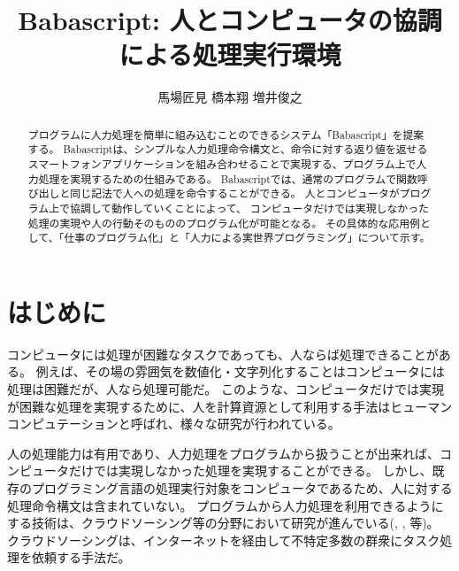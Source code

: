 \documentclass[twoside]{wiss}
\begin{document}
\title{Babascript: 人とコンピュータの協調による処理実行環境}
\etitle{} %

\author{{馬場匠見} \hspace{1em}
        {橋本翔} \hspace{1em}
        {増井俊之
        }
        }

\begin{abstract}

プログラムに人力処理を簡単に組み込むことのできるシステム「Babascript」を提案する。
Babascriptは、シンプルな人力処理命令構文と、命令に対する返り値を返せるスマートフォンアプリケーションを組み合わせることで実現する、プログラム上で人力処理を実現するための仕組みである。
Babascriptでは、通常のプログラムで関数呼び出しと同じ記法で人への処理を命令することができる。
人とコンピュータがプログラム上で協調して動作していくことによって、
コンピュータだけでは実現しなかった処理の実現や人の行動そのもののプログラム化が可能となる。
その具体的な応用例として、「仕事のプログラム化」と「人力による実世界プログラミング」について示す。

\end{abstract}

\maketitle

\section{はじめに}
コンピュータには処理が困難なタスクであっても、人ならば処理できることがある。
例えば、その場の雰囲気を数値化・文字列化することはコンピュータには処理は困難だが、人なら処理可能だ。
このような、コンピュータだけでは実現が困難な処理を実現するために、人を計算資源として利用する手法はヒューマンコンピュテーション\cite{humancomputation}と呼ばれ、様々な研究が行われている。

人の処理能力は有用であり、人力処理をプログラムから扱うことが出来れば、コンピュータだけでは実現しなかった処理を実現することができる。
しかし、既存のプログラミング言語の処理実行対象をコンピュータであるため、人に対する処理命令構文は含まれていない。
プログラムから人力処理を利用できるようにする技術は、クラウドソーシング等の分野において研究が進んでいる(\cite{automan}, \cite{crowddb}, \cite{crowdforge}等)。
クラウドソーシングは、インターネットを経由して不特定多数の群衆にタスク処理を依頼する手法だ\cite{riseofcrowdsourcing}。
\end{document}
